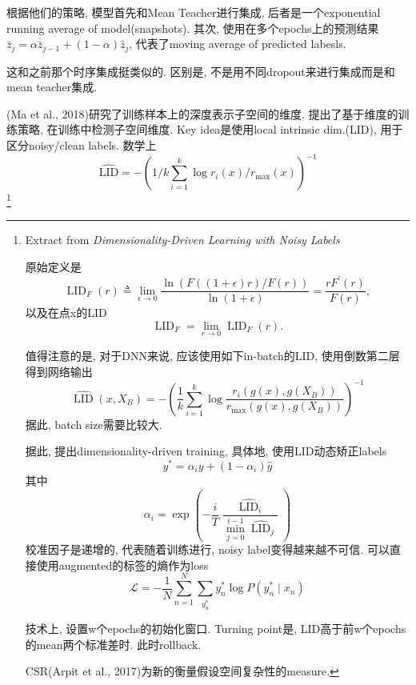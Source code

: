 \documentclass{article}
\begin{document}
根据他们的策略, 模型首先和Mean Teacher进行集成, 后者是一个exponential running average of model(snapshots). 其次, 使用在多个epochs上的预测结果
$\bar{z}_{j}=\alpha \overline{\bar{z}}_{j-1}+(1-\alpha) \hat{z}_{j}$,
代表了moving average of predicted labesls.

\begin{remark}
    这和之前那个时序集成挺类似的. 区别是, 不是用不同dropout来进行集成而是和mean teacher集成.
\end{remark}

(Ma et al., 2018)研究了训练样本上的深度表示子空间的维度. 提出了基于维度的训练策略, 在训练中检测子空间维度. Key idea是使用local intrinsic dim.(LID), 用于区分noisy/clean labels. 数学上
\begin{equation}
    \widehat{\mathrm{LID}}=-\left(1 / k \sum_{i=1}^{k} \log r_{i}(x) / r_{\max }(x)\right)^{-1}
\end{equation}\footnote{
    Extract from \textit{Dimensionality-Driven Learning with Noisy Labels}

    原始定义是
    \begin{equation}
        \operatorname{LID}_{F}(r) \triangleq \lim _{\epsilon \rightarrow 0} \frac{\ln (F((1+\epsilon) r) / F(r))}{\ln (1+\epsilon)}=\frac{r F^{\prime}(r)}{F(r)},
    \end{equation}
    以及在点x的LID
    \begin{equation}
        \operatorname{LID}_{F}=\lim _{r \rightarrow 0} \operatorname{LID}_{F}(r) .
    \end{equation}

    值得注意的是, 对于DNN来说, 应该使用如下in-batch的LID, 使用倒数第二层得到网络输出
    \begin{equation}
        \widehat{\operatorname{LID}}\left(x, X_{B}\right)=-\left(\frac{1}{k} \sum_{i=1}^{k} \log \frac{r_{i}\left(g(x), g\left(X_{B}\right)\right)}{r_{\max }\left(g(x), g\left(X_{B}\right)\right)}\right)^{-1}
    \end{equation}
    据此, batch size需要比较大.

    据此, 提出dimensionality-driven training, 具体地, 使用LID动态矫正labels
    \begin{equation}
        y^{*}=\alpha_{i} y+\left(1-\alpha_{i}\right) \widehat{y}
    \end{equation}
    其中
    \begin{equation}
        \alpha_{i}=\exp \left(-\frac{i}{T} \frac{\widehat{\operatorname{LID}}_{i}}{\min _{j=0}^{i-1} \widehat{\operatorname{LID}}_{j}}\right)
    \end{equation}
    校准因子是递增的, 代表随着训练进行, noisy label变得越来越不可信. 可以直接使用augmented的标签的熵作为loss
    \begin{equation}
        \mathcal{L}=-\frac{1}{N} \sum_{n=1}^{N} \sum_{y_{n}^{*}} y_{n}^{*} \log P\left(y_{n}^{*} \mid x_{n}\right)
    \end{equation}

    技术上, 设置w个epochs的初始化窗口. Turning point是, LID高于前w个epochs的mean两个标准差时. 此时rollback.

    CSR(Arpit et al., 2017)为新的衡量假设空间复杂性的measure.
}
\end{document}

